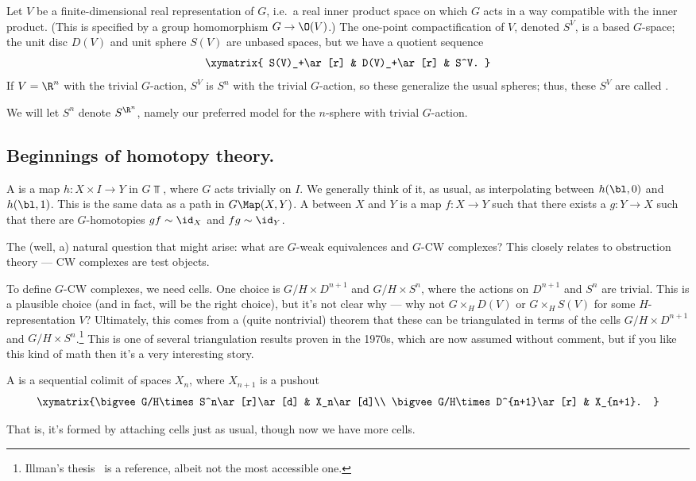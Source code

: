 \begin{exm}
Let $V$ be a finite-dimensional real representation of $G$, i.e.\ a real inner product space on which $G$ acts in a
way compatible with the inner product. (This is specified by a group homomorphism $G\to\O(V)$.) The one-point
compactification of $V$, denoted $S^V$, is a based $G$-space; the unit disc $D(V)$ and unit sphere $S(V)$ are
unbased spaces, but we have a quotient sequence
\[\xymatrix{
	S(V)_+\ar[r] & D(V)_+\ar[r] & S^V.
}\]
If $V = \R^n$ with the trivial $G$-action, $S^V$ is $S^n$ with the trivial $G$-action, so these generalize the
usual spheres; thus, these $S^V$ are called .
\end{exm}
We will let $S^n$ denote $S^{\R^n}$, namely our preferred model for the $n$-sphere with trivial $G$-action.
\subsection*{Beginnings of homotopy theory.}
\begin{defn}
A  is a map $h\colon X\times I\to Y$ in $G\Top$, where $G$ acts trivially on $I$. We generally
think of it, as usual, as interpolating between $h(\bl, 0)$ and $h(\bl, 1)$. This is the same data as a path in
$G\Map(X,Y)$. A  between $X$ and $Y$ is a map $f\colon X\to Y$ such that there
exists a $g\colon Y\to X$ such that there are $G$-homotopies $gf\sim \id_X$ and $fg\sim\id_Y$.
\end{defn}
The (well, a) natural question that might arise: what are $G$-weak equivalences and $G$-CW complexes? This closely
relates to obstruction theory --- CW complexes are test objects.

To define $G$-CW complexes, we need cells. One choice is $G/H\times D^{n+1}$ and $G/H\times S^n$, where the actions
on $D^{n+1}$ and $S^n$ are trivial. This is a plausible choice (and in fact, will be the right choice), but it's
not clear why --- why not $G\times_H D(V)$ or $G\times_H S(V)$ for some $H$-representation $V$? Ultimately, this
comes from a (quite nontrivial) theorem that these can be triangulated in terms of the cells $G/H\times D^{n+1}$
and $G/H\times S^n$.\footnote{Illman's thesis~\cite{IllmanThesis} is a reference, albeit not the most accessible
one.} This is one of several triangulation results proven in the 1970s, which are now assumed without comment, but
if you like this kind of math then it's a very interesting story.
\begin{defn}
A  is a sequential colimit of spaces $X_n$, where $X_{n+1}$ is a pushout
\[\xymatrix{\bigvee G/H\times S^n\ar[r]\ar[d] & X_n\ar[d]\\
\bigvee G/H\times D^{n+1}\ar[r] & X_{n+1}.
}\]
\end{defn}
That is, it's formed by attaching cells just as usual, though now we have more cells.


